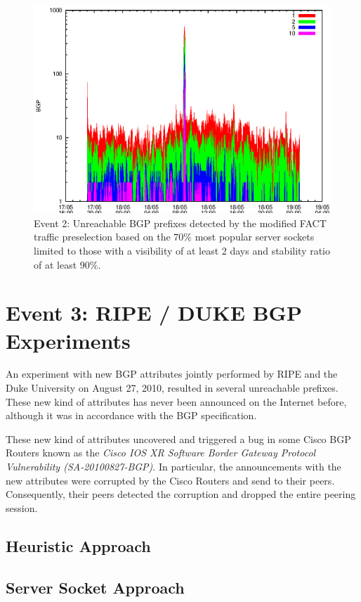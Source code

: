 \begin{figure}
	[ht] \centering 
	\includegraphics[width=0.75\linewidth]{images/events/2010_05_18/bgp_log_Set_var_0_1_stab_9_vts_2.eps}
	\caption{Event 2: Unreachable BGP prefixes detected by the modified FACT traffic preselection based on the $70\%$ most popular server sockets limited to those with a visibility of at least 2 days and stability ratio of at least $90\%$.} 
	\label{fig:TIER1_FACT_popularVTS2STAB9} 
\end{figure}

\newpage
\section{Event 3: RIPE / DUKE BGP Experiments}

An experiment with new BGP attributes jointly performed by RIPE and the Duke 
University on August 27, 2010, resulted in several unreachable prefixes\citep{SchatzmannPAM2011}. These 
new kind of attributes has never been announced on the Internet before,  
although it was in accordance with the BGP specification\citep{ripe_duke}.

These new kind of attributes uncovered and triggered a bug in some Cisco BGP 
Routers known as the \emph{Cisco IOS XR Software Border Gateway Protocol Vulnerability (SA-20100827-BGP)}\citep{cisco_vulnerability}. In particular, the announcements with the new attributes were corrupted 
by the Cisco Routers and send to their peers. Consequently, their peers detected 
the corruption and dropped the entire peering session\citep{ripe_duke}.

\subsection{Heuristic Approach}

\subsection{Server Socket Approach}

